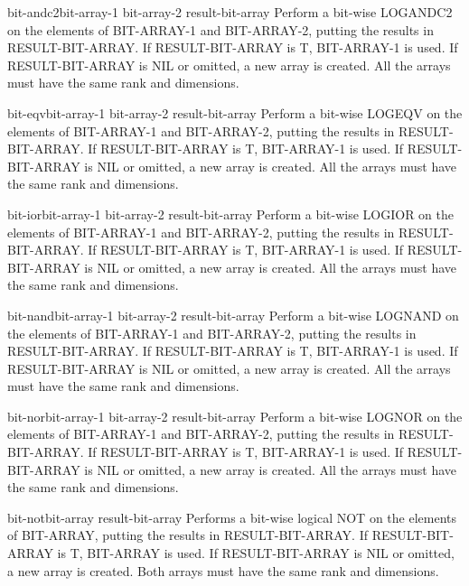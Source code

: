 \documentclass[10pt,english]{book}
\begin{document}
\begin{function}{bit-andc2}{bit-array-1 bit-array-2 \op result-bit-array}
  Perform a bit-wise LOGANDC2 on the elements of BIT-ARRAY-1 and BIT-ARRAY-2,
  putting the results in RESULT-BIT-ARRAY. If RESULT-BIT-ARRAY is T,
  BIT-ARRAY-1 is used. If RESULT-BIT-ARRAY is NIL or omitted, a new array is
  created. All the arrays must have the same rank and dimensions.
\end{function}

\begin{function}{bit-eqv}{bit-array-1 bit-array-2 \op result-bit-array}
  Perform a bit-wise LOGEQV on the elements of BIT-ARRAY-1 and BIT-ARRAY-2,
  putting the results in RESULT-BIT-ARRAY. If RESULT-BIT-ARRAY is T,
  BIT-ARRAY-1 is used. If RESULT-BIT-ARRAY is NIL or omitted, a new array is
  created. All the arrays must have the same rank and dimensions.
\end{function}

\begin{function}{bit-ior}{bit-array-1 bit-array-2 \op result-bit-array}
  Perform a bit-wise LOGIOR on the elements of BIT-ARRAY-1 and BIT-ARRAY-2,
  putting the results in RESULT-BIT-ARRAY. If RESULT-BIT-ARRAY is T,
  BIT-ARRAY-1 is used. If RESULT-BIT-ARRAY is NIL or omitted, a new array is
  created. All the arrays must have the same rank and dimensions.
\end{function}

\begin{function}{bit-nand}{bit-array-1 bit-array-2 \op result-bit-array}
  Perform a bit-wise LOGNAND on the elements of BIT-ARRAY-1 and BIT-ARRAY-2,
  putting the results in RESULT-BIT-ARRAY. If RESULT-BIT-ARRAY is T,
  BIT-ARRAY-1 is used. If RESULT-BIT-ARRAY is NIL or omitted, a new array is
  created. All the arrays must have the same rank and dimensions.
\end{function}

\begin{function}{bit-nor}{bit-array-1 bit-array-2 \op result-bit-array}
  Perform a bit-wise LOGNOR on the elements of BIT-ARRAY-1 and BIT-ARRAY-2,
  putting the results in RESULT-BIT-ARRAY. If RESULT-BIT-ARRAY is T,
  BIT-ARRAY-1 is used. If RESULT-BIT-ARRAY is NIL or omitted, a new array is
  created. All the arrays must have the same rank and dimensions.
\end{function}

\begin{function}{bit-not}{bit-array \op result-bit-array}
  Performs a bit-wise logical NOT on the elements of BIT-ARRAY,
  putting the results in RESULT-BIT-ARRAY. If RESULT-BIT-ARRAY is T,
  BIT-ARRAY is used. If RESULT-BIT-ARRAY is NIL or omitted, a new array is
  created. Both arrays must have the same rank and dimensions.
\end{function}
\end{document}
